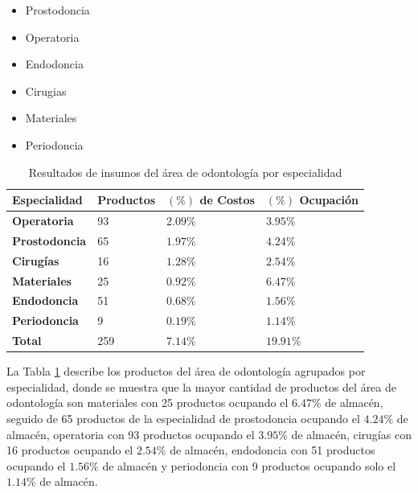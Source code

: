 \begin{itemize}
    \item Prostodoncia
    \item Operatoria
    \item Endodoncia
    \item Cirugias
    \item Materiales
    \item Periodoncia
\end{itemize}

\begin{table}[H]
    \caption{Resultados de insumos del área de odontología por especialidad}
    \begin{tabular}{p{4cm} p{2.5cm} p{3cm} p{3cm}} %
        \hline
        \textbf{Especialidad} & \textbf{Productos} & \textbf{$(\%)$ de Costos} & \textbf{$(\%)$ Ocupación} \\
        \hline
        \textbf{Operatoria} & 93 & $2.09\%$ & $3.95\%$ \\
        \textbf{Prostodoncia} & 65 & $1.97\%$ & $4.24\%$ \\
        \textbf{Cirugías} & 16 & $1.28\%$ & $2.54\%$ \\
        \textbf{Materiales} & 25 & $0.92\%$ & $6.47\%$ \\
        \textbf{Endodoncia} & 51 & $0.68\%$ & $1.56\%$ \\
        \textbf{Periodoncia} & 9 & $0.19\%$ & $1.14\%$ \\
        \hline
        \textbf{Total} & 259 & $7.14\%$ & $19.91\%$
    \end{tabular}
    \label{table:productos_odontologia}
\end{table}

La Tabla \ref{table:productos_odontologia} describe los productos del área de odontología agrupados por especialidad, donde se muestra que la mayor cantidad de productos del área de odontología son materiales con 25 productos ocupando el $6.47\%$ de almacén, seguido de 65 productos de la especialidad de prostodoncia ocupando el $4.24\%$ de almacén, operatoria con 93 productos ocupando el $3.95\%$ de almacén, cirugías con 16 productos ocupando el $2.54\%$ de almacén, endodoncia con 51 productos ocupando el $1.56\%$ de almacén y periodoncia con 9 productos ocupando solo el $1.14\%$ de almacén.

